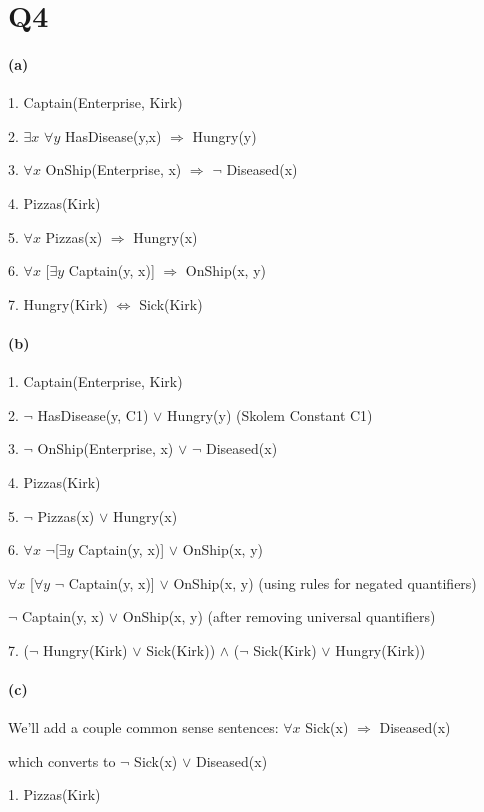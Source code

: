 \documentclass[11pt,a4paper]{article}
\begin{document}
\section*{Q4}
\paragraph*{(a)}

1. Captain(Enterprise, Kirk)

2. $\exists x$ $\forall y$ HasDisease(y,x) $\Rightarrow$ Hungry(y)

3. $\forall x$ OnShip(Enterprise, x) $\Rightarrow$ $\neg$ Diseased(x)

4. Pizzas(Kirk)

5. $\forall x$ Pizzas(x) $\Rightarrow$ Hungry(x)

6. $\forall x$ [$\exists y$ Captain(y, x)] $\Rightarrow$ OnShip(x, y)

7. Hungry(Kirk) $\Leftrightarrow$ Sick(Kirk)

\paragraph*{(b)}

1. Captain(Enterprise, Kirk)

2. $\neg$ HasDisease(y, C1) $\vee$ Hungry(y)     (Skolem Constant C1)

3. $\neg$ OnShip(Enterprise, x) $\vee$ $\neg$ Diseased(x)

4. Pizzas(Kirk)

5. $\neg$ Pizzas(x) $\vee$ Hungry(x)

6. $\forall x$ $\neg$[$\exists y$ Captain(y, x)] $\vee$ OnShip(x, y)

$\forall x$ [$\forall y$ $\neg$ Captain(y, x)] $\vee$ OnShip(x, y)  \qquad(using rules for negated quantifiers)

$\neg$ Captain(y, x) $\vee$ OnShip(x, y)        \qquad(after removing universal quantifiers)

7. ($\neg$ Hungry(Kirk) $\vee$ Sick(Kirk)) $\wedge$ ($\neg$ Sick(Kirk) $\vee$ Hungry(Kirk))

\paragraph*{(c)}
We'll add a couple common sense sentences:
$\forall x$ Sick(x) $\Rightarrow$ Diseased(x)

which converts to $\neg$ Sick(x) $\vee$ Diseased(x)

1. Pizzas(Kirk)
\end{document}
